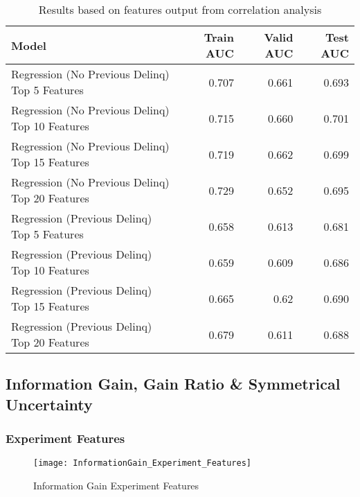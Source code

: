 \begin{table}[H]
	\centering
	\resizebox{\textwidth}{!}
	{
		\begin{tabular}{l | r | r| r}
			\hline
			\textbf{Model} & \textbf{Train AUC} & \textbf{Valid AUC} &  \textbf{Test AUC} \\
			\hline
			Regression (No Previous Delinq) Top 5 Features & 0.707 & 0.661 & 0.693  \\
			Regression (No Previous Delinq) Top 10 Features & 0.715 & 0.660 & 0.701  \\
			\cellcolor{green!25}Regression (No Previous Delinq) Top 15 Features &  \cellcolor{green!25}0.719 &  \cellcolor{green!25}0.662 &  \cellcolor{green!25}0.699  \\
			Regression (No Previous Delinq) Top 20 Features & 0.729 & 0.652 & 0.695  \\
			\hline
			Regression (Previous Delinq) Top 5 Features & 0.658 & 0.613 & 0.681  \\
			Regression (Previous Delinq) Top 10 Features & 0.659 & 0.609 & 0.686  \\
			\cellcolor{green!25}Regression (Previous Delinq) Top 15 Features &  \cellcolor{green!25}0.665 &  \cellcolor{green!25}0.62 &  \cellcolor{green!25}0.690  \\
			Regression (Previous Delinq) Top 20 Features & 0.679 & 0.611 & 0.688  \\	
			\hline
		\end{tabular}
	}
	\caption{Results based on features output from correlation analysis}
	\label{table:featureselection_base_model}
\end{table}

\subsection{Information Gain, Gain Ratio \& Symmetrical Uncertainty}

\subsubsection{Experiment Features}

\begin{figure}[H]
	\texttt{[image: InformationGain\_Experiment\_Features]}
	\caption{Information Gain Experiment Features}
	\label{fig:Information Gain Experiment Features}
\end{figure}

